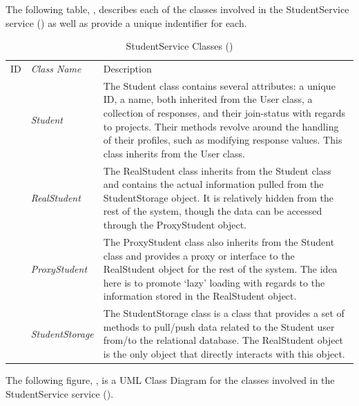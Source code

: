 \documentclass[12pt,letterpaper]{article}
\begin{document}
The following table, , describes each of the classes involved in the StudentService service () as well as provide a unique indentifier for each.

\begin{table}[H]
	\caption{StudentService Classes ()} 
	\begin{tabu} to 
	    \tableheader{}ID & Class Name & Description \\
		 & Student & The Student class contains several attributes: a unique ID, a name, both inherited from the User class, a collection of responses, and their join-status with regards to projects. Their methods revolve around the handling of their profiles, such as modifying response values. This class inherits from the User class. \\
		 & RealStudent & The RealStudent class inherits from the Student class and contains the actual information pulled from the StudentStorage object. It is relatively hidden from the rest of the system, though the data can be accessed through the ProxyStudent object.\\
		 & ProxyStudent & The ProxyStudent class also inherits from the Student class and provides a proxy or interface to the RealStudent object for the rest of the system. The idea here is to promote `lazy' loading with regards to the information stored in the RealStudent object.\\
		 & StudentStorage & The StudentStorage class is a class that provides a set of methods to pull/push data related to the Student user from/to the relational database. The RealStudent object is the only object that directly interacts with this object.\\
	\end{tabu}
\end{table}

The following figure, , is a UML Class Diagram for the classes involved in the StudentService service ().
\end{document}
